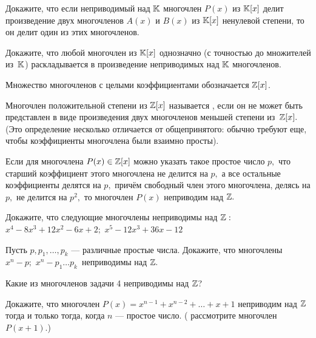 \documentclass[a4paper,12pt]{article}
\begin{document}
 Докажите, что  если неприводимый над $\mathbb{K}$ многочлен $P(x)$ из $\mathbb{K}[x]$
делит произведение двух
многочленов  $A(x)$  и  $B(x)$  из $\mathbb{K}[x]$ ненулевой степени, то
он делит один из этих многочленов.

 Докажите, что  любой многочлен из $\mathbb{K}[x]$ однозначно (с точностью до
множителей из~$\mathbb{K}$) раскладывается в произведение неприводимых над  $\mathbb{K}$
многочленов.







 Множество многочленов с целыми коэффициентами обозначается $\mathbb{Z}[x]$.


Многочлен положительной степени из  $\mathbb{Z}[x]$  называется
,\/
если он не может быть представлен в виде произведения двух многочленов
меньшей степени из~$\mathbb{Z}[x].$
(Это определение несколько отличается от общепринятого:
обычно требуют еще, чтобы коэффициенты многочлена были
взаимно просты).


 Если для многочлена  $P(x)\in\mathbb{Z}[x]$
можно указать такое простое число  $p,$  что старший коэффициент этого
многочлена не делится на  $p,$  а все остальные коэффициенты делятся на
 $p,$  прич\"ем свободный член этого многочлена, делясь на  $p,$  не делится
на  $p^2,$  то многочлен  $P(x)$  неприводим над  $\mathbb{Z}.$

 Докажите, что  следующие многочлены неприводимы над  $\mathbb{Z}:$\\
 $x^4-8x^3+12x^2-6x+2;$
 $x^5-12x^3+36x-12$

 Пусть  $p,p_1,\dots,p_k$  --- различные простые числа.
Докажите, что  многочлены\\
 $x^n-p;$
 $x^n-p_1\dots p_k\,$  неприводимы над  $\mathbb{Z}.$


 Какие из многочленов задачи 4 неприводимы над  $\mathbb{Z}$?


 Докажите, что  многочлен
$P(x)=x^{n-1}+x^{n-2}+\dots+x+1$  неприводим над  $\mathbb{Z}$
тогда и только тогда, когда  $n$  --- простое число.\quad
( рассмотрите многочлен  $P(x+1)$.)



\end{document}
